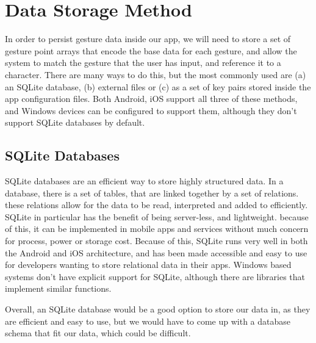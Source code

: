\documentclass[onecolumn, draftclsnofoot,10pt, journal, letterpaper]{IEEEtran}
\begin{document}
\section{Data Storage Method}
    In order to persist gesture data inside our app, we will need to store a set of gesture point arrays that encode the base data for each gesture, and allow the system to match the gesture that the user has input, and reference it to a character. There are many ways to do this, but the most commonly used are (a) an SQLite database, (b) external files or (c) as a set of key pairs stored inside the app configuration files. Both Android, iOS support all three of these methods, and Windows devices can be configured to support them, although they don't support SQLite databases by default.
    
    \subsection{SQLite Databases}
    SQLite databases are an efficient way to store highly structured data. In a database, there is a set of tables, that are linked together by a set of relations. these relations allow for the data to be read, interpreted and added to efficiently. \cite{noauthor_what_2019} SQLite in particular has the benefit of being server-less, and lightweight. because of this, it can be implemented in mobile apps and services without much concern for process, power or storage cost. \cite{noauthor_what_2019} Because of this, SQLite runs very well in both the Android and iOS architecture, and has been made accessible and easy to use for developers wanting to store relational data in their apps. Windows based systems don't have explicit support for SQLite, although there are libraries that implement similar functions. \cite{noauthor_use_2018}\par
    Overall, an SQLite database would be a good option to store our data in, as they are efficient and easy to use, but we would have to come up with a database schema that fit our data, which could be difficult.
    
\end{document}
